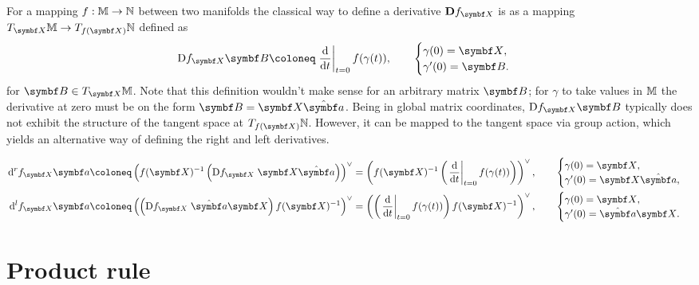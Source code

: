For a mapping $f : \mathbb{M} \rightarrow \mathbb{N}$ between two manifolds the classical way to define a derivative $\mathbf{D} f_\X$ is as a mapping $T_\X \M \rightarrow T_{f(\X)} \N$ defined as
\begin{equation}
  \mathrm{D} f_\X \B \coloneq \left. \frac{\mathrm{d}}{\mathrm{d}t} \right|_{t = 0} f(\gamma(t)), \qquad \begin{cases}
    \gamma(0) = \X, \\
    \gamma'(0) = \B.
  \end{cases}
\end{equation}
for $\B \in T_\X \M$. Note that this definition wouldn't make sense for an arbitrary matrix $\B$; for $\gamma$ to take values in $\mathbb{M}$ the derivative at zero must be on the form $\B = \X \hat \a$. Being in global matrix coordinates, $\mathrm{D} f_\X \B$ typically does not exhibit the structure of the tangent space at $T_{f(\X)} \N$. However, it can be mapped to the tangent space via group action, which yields an alternative way of defining the right and left derivatives.

\begin{equation}
  \label{eq:rght_deriv_traditional}
  \begin{aligned}
    \mathrm{d}^r f_\X \a & \coloneq \left( f(\X)^{-1} \left( \mathrm{D} f_\X \; \X \hat \a \right) \right)^{\vee} = \left( f(\X)^{-1} \left( \left. \frac{\mathrm{d}}{\mathrm{d}t} \right|_{t = 0} f(\gamma(t)) \right) \right)^\vee, \qquad \begin{cases} \gamma(0) = \X, \\ \gamma'(0) = \X \hat \a, \end{cases}  \\
    \mathrm{d}^l f_\X \a & \coloneq \left( \left( \mathrm{D} f_\X \; \hat \a \X \right) f(\X)^{-1} \right)^{\vee} = \left( \left( \left. \frac{\mathrm{d}}{\mathrm{d}t} \right|_{t = 0} f(\gamma(t)) \right) f(\X)^{-1}  \right)^\vee, \qquad \begin{cases} \gamma(0) = \X, \\ \gamma'(0) = \hat \a \X. \end{cases}
  \end{aligned}
\end{equation}



\section{Product rule}

